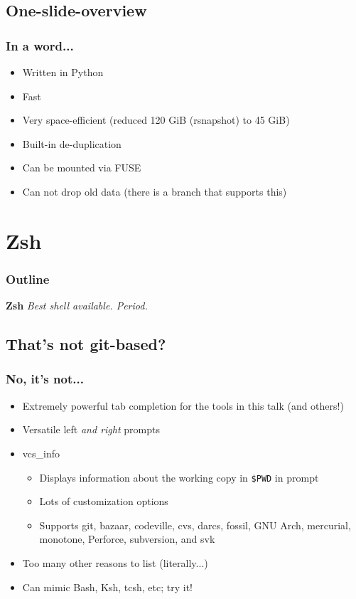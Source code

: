 \documentclass[t]{beamer}
\begin{document}
\subsection{One-slide-overview}

\begin{frame}
	\frametitle{In a word...}
	\begin{itemize}
		\item Written in Python
		\item Fast
		\item Very space-efficient (reduced 120 GiB (rsnapshot) to 45 GiB)
		\item Built-in de-duplication
		\item Can be mounted via FUSE
		\item Can not drop old data (there is a branch that supports this)
	\end{itemize}
\end{frame}


\section{Zsh}

\begin{frame}
	\frametitle{Outline}
	\tableofcontents[currentsection]
\end{frame}

\begin{frame}
		\begin{center}
			\vfill
			\vfill
			\textbf{Zsh}
			\vfill
			\textit{Best shell available. Period.}
			\vfill
			\vfill
		\end{center}
\end{frame}

\subsection{That's not git-based?}

\begin{frame}
	\frametitle{No, it's not...}
	\begin{itemize}
		\item Extremely powerful tab completion for the tools in this talk (and others!)
		\item Versatile left \emph{and right} prompts
		\item vcs\_info
		\begin{itemize}
			\item Displays information about the working copy in \texttt{\$PWD} in prompt
			\item Lots of customization options
			\item Supports git, bazaar, codeville, cvs, darcs, fossil, GNU Arch, mercurial, monotone, Perforce, subversion, and svk
		\end{itemize}
		\item Too many other reasons to list (literally...)
		\item Can mimic Bash, Ksh, tcsh, etc; try it!
	\end{itemize}
\end{frame}
\end{document}

